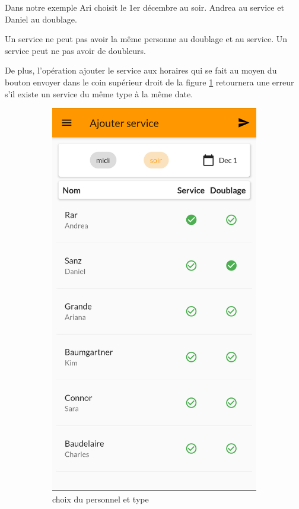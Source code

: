     \newpage
    Dans notre exemple Ari choisit le 1er décembre au soir. Andrea au service et Daniel au doublage.

    Un service ne peut pas avoir la même personne au doublage et au service. Un service peut ne pas avoir
    de doubleurs. 

    De plus, l'opération ajouter le service aux horaires qui se fait au moyen du bouton envoyer
    dans le coin supérieur droit de la figure \ref{fig:ajout_service_c} retournera une erreur s'il existe un 
    service du même type à la même date.

    \begin{center}
    \begin{figure}[h]
        \centering
        \begin{subfigure}{.45\textwidth}
            \centering
            \includegraphics[width=0.6\linewidth]{screenshots/scenario_05/ajout_service_c.png}
            \caption{choix du personnel et type}
            \label{fig:ajout_service_c}
        \end{subfigure}
        \begin{subfigure}{.45\textwidth}
            \centering

\end{subfigure}
\end{figure}
\end{center}
